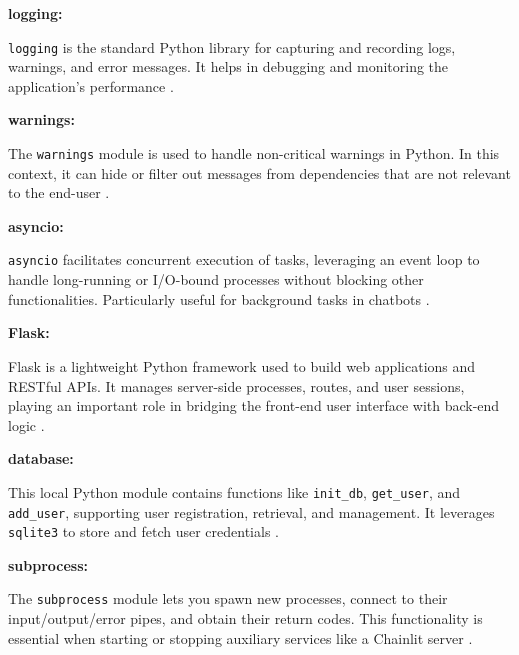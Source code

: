 \vspace{0.4cm}
\noindent\textbf{logging:}

\noindent
\texttt{logging} is the standard Python library for capturing and recording logs, warnings, and error messages. 
It helps in debugging and monitoring the application’s performance \cite{pythonlibrary}.

\vspace{0.4cm}
\noindent\textbf{warnings:}

\noindent
The \texttt{warnings} module is used to handle non-critical warnings in Python. In this context, it can hide or filter 
out messages from dependencies that are not relevant to the end-user \cite{pythonlibrary}.

\vspace{0.4cm}
\noindent\textbf{asyncio:}

\noindent
\texttt{asyncio} facilitates concurrent execution of tasks, leveraging an event loop to handle long-running or 
I/O-bound processes without blocking other functionalities. Particularly useful for background tasks in chatbots \cite{pythonlibrary}.

\vspace{0.4cm}
\noindent\textbf{Flask:}

\noindent
Flask is a lightweight Python framework used to build web applications and RESTful APIs. 
It manages server-side processes, routes, and user sessions, playing an important role in bridging
the front-end user interface with back-end logic \cite{pythonlibrary}.

\vspace{0.4cm}
\noindent\textbf{database:}

\noindent
This local Python module contains functions like \texttt{init\_db}, \texttt{get\_user}, and \texttt{add\_user}, 
supporting user registration, retrieval, and management. It leverages \texttt{sqlite3} to store and fetch user credentials \cite{pythonlibrary}.

\vspace{0.4cm}
\noindent\textbf{subprocess:}

\noindent
The \texttt{subprocess} module lets you spawn new processes, connect to their input/output/error pipes,
and obtain their return codes. This functionality is essential when starting or stopping auxiliary services 
like a Chainlit server \cite{pythonlibrary}.

